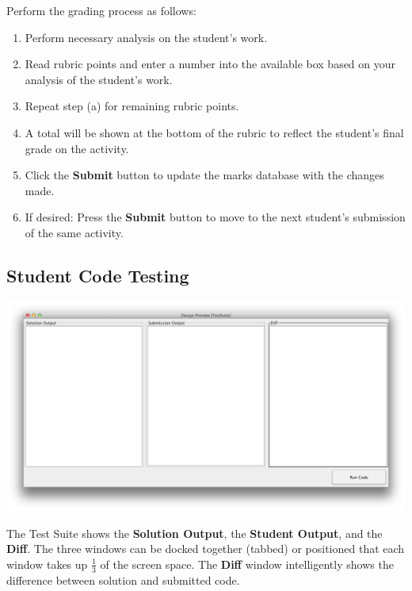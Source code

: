 \documentclass{article}
\begin{document}
\begin{enumerate}
\begin{center}
   \label{marking}
  \end{center}
    Perform the grading process as follows:
    \begin{enumerate}
      \item Perform necessary analysis on the student's work. 
      \item Read rubric points and enter a number into the available box 
        based on your analysis of the student's work.
      \item Repeat step (a) for remaining rubric points.
      \item A total will be shown at the bottom of the rubric to reflect the
        student's final grade on the activity.
       \item Click the \textbf{Submit} button to update the marks database with
         the changes made.
         \item If desired: Press the \textbf{Submit} button to move to the next
    student's submission of the same activity.
    \end{enumerate}
\end{enumerate}
\clearpage

\subsection{Student Code Testing}
\begin{center}
\includegraphics[scale=0.35]{../images/UpdatedUIScreens/TestSuite.png}
\label{testSuite}
\end{center}
The Test Suite shows the \textbf{Solution Output}, the \textbf{Student Output},
and the \textbf{Diff}.
The three windows can be docked together (tabbed) or positioned that each
window takes up $\frac{1}{3}$ of the screen space.
The \textbf{Diff} window intelligently shows the difference between
solution and submitted code.
\clearpage
\end{document}
